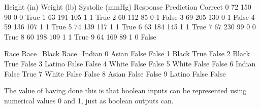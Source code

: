 \documentclass[letterpaper,10pt,english]{jupyterBook}
\begin{document}
\begin{sphinxVerbatim}[commandchars=\\\{\}]
\PYG{p}{[}\PYG{p}{]}  \PYG{p}{[}\PYG{p}{]}  
\PYG{p}{[}\PYG{p}{]}  \PYG{p}{[}\PYG{p}{]}  
\end{sphinxVerbatim}

\begin{sphinxVerbatim}[commandchars=\\\{\}]
   Height (in)  Weight (lb)  Systolic (mmHg)  Response  Prediction  Correct  \PYGZbs{}
0           72          150               90         0           0     True   
1           63          191              105         1           1     True   
2           60          112               85         0           1    False   
3           69          205              130         0           1    False   
4           59          136              107         1           1     True   
5           74          139              117         1           1     True   
6           63          184              145         1           1     True   
7           67          230               99         0           0     True   
8           60          198              109         1           1     True   
9           64          169               89         1           0    False   

     Race  Race=Black  Race=Indian  
0   Asian       False        False  
1   Black        True        False  
2   Black        True        False  
3  Latino       False        False  
4   White       False        False  
5   White       False        False  
6  Indian       False         True  
7   White       False        False  
8   Asian       False        False  
9  Latino       False        False  
\end{sphinxVerbatim}

\sphinxAtStartPar
The value of having done this is that boolean inputs can be represented using numerical values 0 and 1, just as boolean outputs can.
\end{document}

